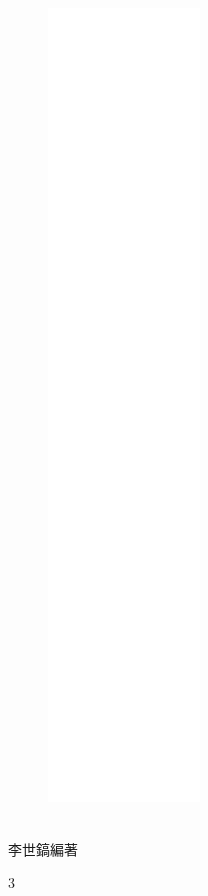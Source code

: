 \documentclass[a5paper,12pt]{memoir}
\newenvironment{changemargin}[2]{%
  \begin{list}{}{%
    \setlength{\topsep}{0pt}%
    \setlength{\leftmargin}{#1}%
    \setlength{\rightmargin}{#2}%
    \setlength{\listparindent}{\parindent}%
    \setlength{\itemindent}{\parindent}%
    \setlength{\parsep}{\parskip}%
  }%
  \item[]}{\end{list}}
\begin{document}
\frontmatter
\begin{changemargin}{0cm}{0cm}
\begin{figure}
\centering
\includegraphics[height=210mm]{cover.png}
\end{figure}
\linespread{1.25}
\hfill
\vfill
{}\\
{李世鎬\hspace{14pt}編著}
\vspace{64pt}
\end{changemargin}
\newpage
\linespread{1.25}

\mainmatter
\linespread{1.25}
\begin{multicols}{3}

\end{multicols}
\newpage

\end{document}

